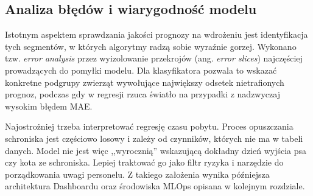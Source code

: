 \subsection{Analiza błędów i wiarygodność modelu}

Istotnym aspektem sprawdzania jakości prognozy na wdrożeniu jest identyfikacja tych segmentów, w których algorytmy radzą sobie wyraźnie gorzej. Wykonano tzw. \emph{error analysis} przez wyizolowanie przekrojów (ang. \emph{error slices}) najczęściej prowadzących do pomyłki modelu. Dla klasyfikatora pozwala to wskazać konkretne podgrupy zwierząt wywołujące największy odsetek nietrafionych prognoz, podczas gdy w regresji rzuca światło na przypadki z nadzwyczaj wysokim błędem MAE.



Najostrożniej trzeba interpretować regresję czasu pobytu. Proces opuszczania schroniska jest częściowo losowy i zależy od czynników, których nie ma w tabeli danych. Model nie jest więc ,,wyrocznią'' wskazującą dokładny dzień wyjścia psa czy kota ze schroniska. Lepiej traktować go jako filtr ryzyka i narzędzie do porządkowania uwagi personelu. Z takiego założenia wynika późniejsza architektura Dashboardu oraz środowiska MLOps opisana w kolejnym rozdziale.
